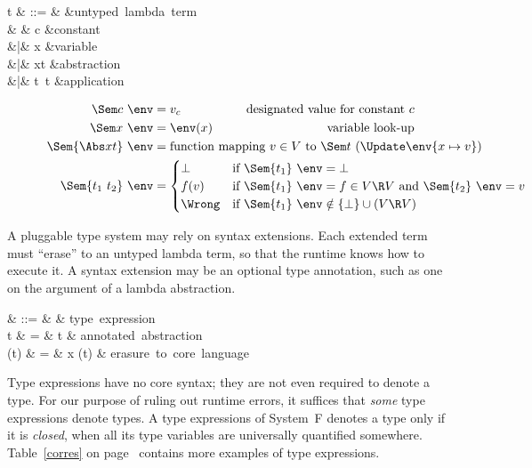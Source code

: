 \documentclass{amsart}
\theoremstyle{definition}
\begin{document}
\begin{syntax}
t & ::= & &\mbox{untyped lambda term} \\
& & c &\mbox{constant} \\
&|& x &\mbox{variable} \\
&|& \Abs xt &\mbox{abstraction} \\
&|& t~t &\mbox{application}
\end{syntax}
%
\begin{align*}
\Sem c~\env &= v_c & \mbox{designated value for constant }c\\
\Sem x~\env &= \env(x) & \mbox{variable look-up}\\
\Sem{\Abs x t}~\env &=
\rlap{function mapping $v\in V$ to $\Sem t~(\Update\env{x\mapsto v})$}\\
\Sem{t_1~t_2}~\env &=
\begin{cases}
\bot&\rlap{if $\Sem{t_1}~\env=\bot$}\\
f(v)&\rlap{if $\Sem{t_1}~\env=f\in V\R V$ and $\Sem{t_2}~\env=v$}\\
\Wrong&\rlap{if $\Sem{t_1}~\env\notin \{\bot\}\cup(V\R V)$}
\end{cases}
\end{align*}

A pluggable type system may rely on syntax extensions. Each
extended term must ``erase'' to an untyped lambda term, so that
the runtime knows how to execute it. A syntax extension may be an
optional type annotation, such as one on the argument of a lambda
abstraction.
\begin{syntax}
\sigma & ::= & \cdots & \mbox{type expression}\\
t & \+= & t & \mbox{annotated abstraction}\\
\Erase(t) & = & \Abs x \Erase(t) &
\mbox{erasure to core language}
\end{syntax}

Type expressions have no core syntax; they are not even required
to denote a type. For our purpose of ruling out runtime errors,
it suffices that \emph{some} type expressions denote types. A
type expressions of System~F denotes a type only if it is
\emph{closed}, when all its type variables are universally
quantified somewhere. Table~\ref{corres} on page~\pageref{corres}
contains more examples of type expressions.
\end{document}
